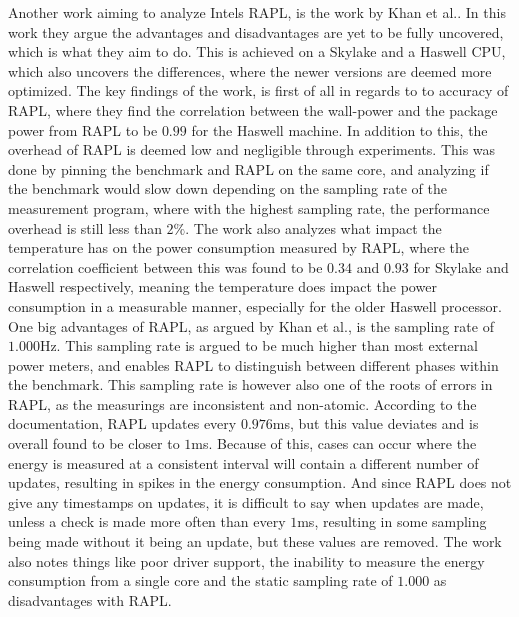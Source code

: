 Another work aiming to analyze Intels RAPL, is the work by Khan et al.\cite*[]{RAPL_in_action}. In this work they argue the advantages and disadvantages are yet to be fully uncovered, which is what they aim to do. This is achieved on a Skylake and a Haswell CPU, which also uncovers the differences, where the newer versions are deemed more optimized. The key findings of the work, is first of all in regards to to accuracy of RAPL, where they find the correlation between the wall-power and the package power from RAPL to be $0.99$ for the Haswell machine. In addition to this, the overhead of RAPL is deemed low and negligible through experiments. This was done by pinning the benchmark and RAPL on the same core, and analyzing if the benchmark would slow down depending on the sampling rate of the measurement program, where with the highest sampling rate, the performance overhead is still less than $2\%$. The work also analyzes what impact the temperature has on the power consumption measured by RAPL, where the correlation coefficient between this was found to be $0.34$ and $0.93$ for Skylake and Haswell respectively, meaning the temperature does impact the power consumption in a measurable manner, especially for the older Haswell processor. One big advantages of RAPL, as argued by Khan et al.\cite*[]{RAPL_in_action}, is the sampling rate of $1.000$Hz. This sampling rate is argued to be much higher than most external power meters, and enables RAPL to distinguish between different phases within the benchmark. This sampling rate is however also one of the roots of errors in RAPL, as the measurings are inconsistent and non-atomic. According to the documentation, RAPL updates every $0.976$ms, but this value deviates and is overall found to be closer to $1$ms. Because of this, cases can occur where the energy is measured at a consistent interval will contain a different number of updates, resulting in spikes in the energy consumption. And since RAPL does not give any timestamps on updates, it is difficult to say when updates are made, unless a check is made more often than every $1$ms, resulting in some sampling being made without it being an update, but these values are removed. The work\cite*[]{RAPL_in_action} also notes things like poor driver support, the inability to measure the energy consumption from a single core and the static sampling rate of $1.000$ as disadvantages with RAPL.



